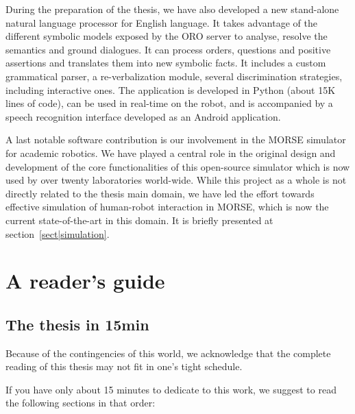During the preparation of the thesis, we have also developed a new stand-alone
natural language processor for English language. It takes advantage of the
different symbolic models exposed by the ORO server to analyse, resolve the
semantics and ground dialogues. It can process orders, questions and positive
assertions and translates them into new symbolic facts. It includes a custom
grammatical parser, a re-verbalization module, several discrimination
strategies, including interactive ones. The application is developed in Python
(about 15K lines of code), can be used in real-time on the robot, and is
accompanied by a speech recognition interface developed as an Android
application.

A last notable software contribution is our involvement in the MORSE simulator
for academic robotics. We have played a central role in the original design and
development of the core functionalities of this open-source simulator which is
now used by over twenty laboratories world-wide. While this project as a whole
is not directly related to the thesis main domain, we have led the effort towards
effective simulation of human-robot interaction in MORSE, which is now the
current state-of-the-art in this domain. It is briefly presented at
section~\ref{sect|simulation}.




\section{A reader's guide}

\subsection*{The thesis in 15min}

Because of the contingencies of this world, we acknowledge that the complete
reading of this thesis may not fit in one's tight schedule.

If you have only about 15 minutes to dedicate to this work, we suggest to read
the following sections in that order:

